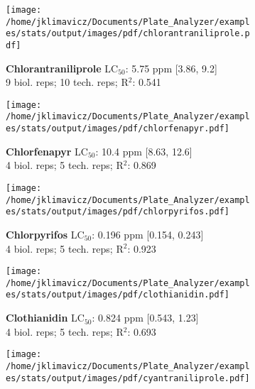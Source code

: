 \documentclass{article}
\begin{document}
\begin{figure}[thp!]
   \begin{subfigure}{0.500\textwidth}
      \centering
      \texttt{[image: /home/jklimavicz/Documents/Plate\_Analyzer/examples/stats/output/images/pdf/chlorantraniliprole.pdf]}
      \vspace{-0.05cm}
      \caption*{\textbf{Chlorantraniliprole} LC$_{50}$: 5.75 ppm [3.86, 9.2] \\ 
9 biol. reps; 10 tech. reps; R$^2$: 0.541}
      \vspace{0.1cm}
   \end{subfigure}%
   \begin{subfigure}{0.500\textwidth}
      \centering
      \texttt{[image: /home/jklimavicz/Documents/Plate\_Analyzer/examples/stats/output/images/pdf/chlorfenapyr.pdf]}
      \vspace{-0.05cm}
      \caption*{\textbf{Chlorfenapyr} LC$_{50}$: 10.4 ppm [8.63, 12.6] \\ 
4 biol. reps; 5 tech. reps; R$^2$: 0.869}
      \vspace{0.1cm}
   \end{subfigure}%
\vspace{-0.1cm}
   \begin{subfigure}{0.500\textwidth}
      \centering
      \texttt{[image: /home/jklimavicz/Documents/Plate\_Analyzer/examples/stats/output/images/pdf/chlorpyrifos.pdf]}
      \vspace{-0.05cm}
      \caption*{\textbf{Chlorpyrifos} LC$_{50}$: 0.196 ppm [0.154, 0.243] \\ 
4 biol. reps; 5 tech. reps; R$^2$: 0.923}
      \vspace{0.1cm}
   \end{subfigure}%
   \begin{subfigure}{0.500\textwidth}
      \centering
      \texttt{[image: /home/jklimavicz/Documents/Plate\_Analyzer/examples/stats/output/images/pdf/clothianidin.pdf]}
      \vspace{-0.05cm}
      \caption*{\textbf{Clothianidin} LC$_{50}$: 0.824 ppm [0.543, 1.23] \\ 
4 biol. reps; 5 tech. reps; R$^2$: 0.693}
      \vspace{0.1cm}
   \end{subfigure}%
\vspace{-0.1cm}
   \begin{subfigure}{0.500\textwidth}
      \centering
      \texttt{[image: /home/jklimavicz/Documents/Plate\_Analyzer/examples/stats/output/images/pdf/cyantraniliprole.pdf]}

\end{subfigure}
\end{figure}
\end{document}
